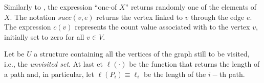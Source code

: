 Similarly to \cite{koenig2001}, the expression ``one-of $X$'' returns randomly one of the elements of $X$. The notation $succ(v,e)$ returns the vertex linked to $v$ through the edge $e$. The expression $c(v)$ represents the count value associated with to the vertex $v$, initially set to zero for all $v \in V$.

Let be $U$ a structure containing all the vertices of the graph still to be visited, i.e., the \emph{unvisited set}. At last et $\ell(\cdot)$ be the function that returns the length of a path and, in particular, let $\ell(P_i) \equiv \ell_i$ be the length of the $i-$th path.





